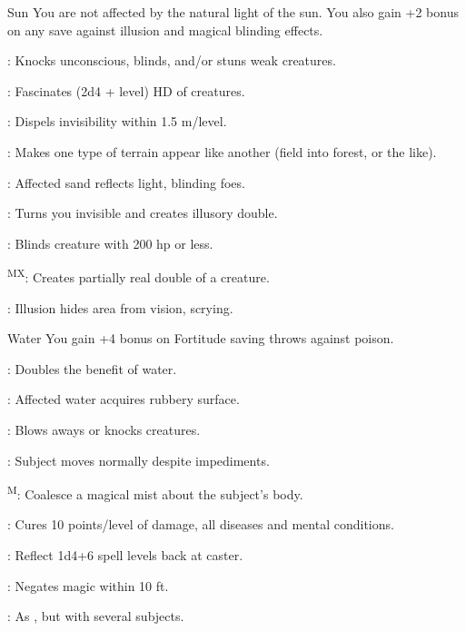 {Sun}
{You are not affected by the natural light of the sun. You also gain +2 bonus on any save against illusion and magical blinding effects.}
{
	\item {}: Knocks unconscious, blinds, and/or stuns weak creatures.
	\item {}: Fascinates (2d4 + level) HD of creatures.
	\item {}: Dispels invisibility within 1.5 m/level.
	\item {}: Makes one type of terrain appear like another (field into forest, or the like).
	\item {}: Affected sand reflects light, blinding foes.
	\item {}: Turns you invisible and creates illusory double.
	\item {}: Blinds creature with 200 hp or less.
	\item {}\textsuperscript{MX}: Creates partially real double of a creature.
	\item {}: Illusion hides area from vision, scrying.
}

{Water}
{You gain +4 bonus on Fortitude saving throws against poison.}
{
	\item {}: Doubles the benefit of water.
	\item {}: Affected water acquires rubbery surface.
	\item {}: Blows aways or knocks creatures.
	\item {}: Subject moves normally despite impediments.
	\item {}\textsuperscript{M}: Coalesce a magical mist about the subject's body.
	\item {}: Cures 10 points/level of damage, all diseases and mental conditions.
	\item {}: Reflect 1d4+6 spell levels back at caster.
	\item {}: Negates magic within 10 ft.
	\item {}: As , but with several subjects.
}

